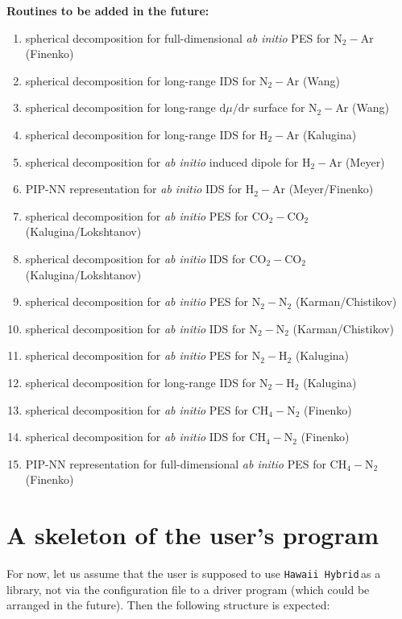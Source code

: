 \documentclass{article}
\newcommand{\libname}{\texttt{Hawaii Hybrid}\,}
\begin{document}
\noindent
{\textbf{Routines to be added in the future:}}
\begin{enumerate}
\item spherical decomposition for full-dimensional \textit{ab initio} PES for N$_2-$Ar (Finenko)
\item spherical decomposition for long-range IDS for N$_2-$Ar (Wang)
\item spherical decomposition for long-range $\textrm{d}\mu/\textrm{d}r$ surface for N$_2-$Ar (Wang)
\item spherical decomposition for long-range IDS for H$_2-$Ar (Kalugina)
\item spherical decomposition for \textit{ab initio} induced dipole for H$_2-$Ar (Meyer)
\item PIP-NN representation for \textit{ab initio} IDS for H$_2-$Ar (Meyer/Finenko)
\item spherical decomposition for \textit{ab initio} PES for CO$_2-$CO$_2$ (Kalugina/Lokshtanov)
\item spherical decomposition for \textit{ab initio} IDS for CO$_2-$CO$_2$ (Kalugina/Lokshtanov)
\item spherical decomposition for \textit{ab initio} PES for N$_2-$N$_2$ (Karman/Chistikov)
\item spherical decomposition for \textit{ab initio} IDS for N$_2-$N$_2$ (Karman/Chistikov)
\item spherical decomposition for \textit{ab initio} PES for N$_2-$H$_2$ (Kalugina)
\item spherical decomposition for long-range IDS for N$_2-$H$_2$ (Kalugina)
\item spherical decomposition for \textit{ab initio} PES for CH$_4-$N$_2$ (Finenko)
\item spherical decomposition for \textit{ab initio} IDS for CH$_4-$N$_2$ (Finenko)
\item PIP-NN representation for full-dimensional \textit{ab initio} PES for CH$_4-$N$_2$ (Finenko)
\end{enumerate}



\section{A skeleton of the user's program}
\label{sec:user-program}

For now, let us assume that the user is supposed to use \libname as a library, not via the configuration file to a driver program (which could be arranged in the future). Then the following structure is expected:
\end{document}
